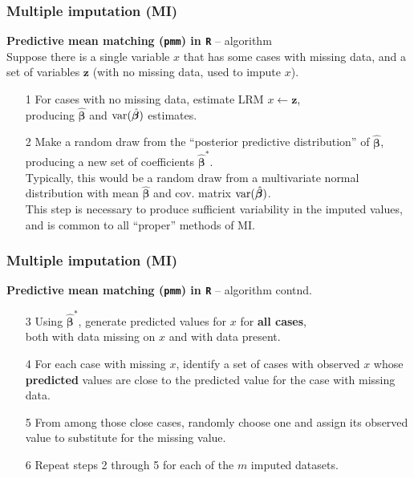 \documentclass{beamer}
\begin{document}
\begin{frame}
\frametitle{Multiple imputation (MI)}
\textbf{Predictive mean matching (\texttt{pmm}) in \texttt{R}} -- algorithm\\
\medskip
Suppose there is a single variable $x$ that has some cases with missing data, and a set of variables $\bm{z}$ (with no missing data, used to impute $x$).
\bigskip
\begin{enumerate}
    \item[1] For cases with no missing data, estimate LRM $x \leftarrow \bm{z}$, \\producing $\hat{\bm{\beta}}$ and $\textnormal{var}(\hat{\bm{\beta}})$ estimates.
    \smallskip
    \item[2] Make a random draw from the ``posterior predictive distribution'' of $\hat{\bm{\beta}}$, producing a new set of coefficients $\hat{\bm{\beta}}^{\ast}$.\\
    \smallskip
    Typically, this would be a random draw from a multivariate normal distribution with mean $\hat{\bm{\beta}}$ and cov. matrix $\textnormal{var}(\hat{\bm{\beta}})$. \\
    \smallskip 
    This step is necessary to produce sufficient variability in the imputed values, and is common to all ``proper'' methods of MI.
\end{enumerate}
\end{frame}
\begin{frame}
\frametitle{Multiple imputation (MI)}
\textbf{Predictive mean matching (\texttt{pmm}) in \texttt{R}} -- algorithm contnd.\\
\bigskip
\begin{enumerate}
    \item[3] Using $\hat{\bm{\beta}}^{\ast}$, generate predicted values for $x$ for \textbf{all cases}, \\both with data missing on $x$ and with data present.
    \smallskip
    \item[4] For each case with missing $x$, identify a set of cases with observed $x$ whose \textbf{predicted} values are close to the predicted value for the case with missing data.
    \smallskip
    \item[5] From among those close cases, randomly choose one and assign its observed value to substitute for the missing value.
    \smallskip
    \item[6] Repeat steps 2 through 5 for each of the $m$ imputed datasets.  
\end{enumerate}
\end{frame}
\end{document}
